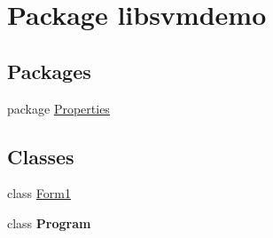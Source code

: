 \hypertarget{namespacelibsvmdemo}{
\section{Package libsvmdemo}
\label{namespacelibsvmdemo}
}
\subsection*{Packages}
\begin{DoxyCompactItemize}
\item 
package \hyperlink{namespacelibsvmdemo_1_1_properties}{Properties}
\end{DoxyCompactItemize}
\subsection*{Classes}
\begin{DoxyCompactItemize}
\item 
class \hyperlink{classlibsvmdemo_1_1_form1}{Form1}
\item 
class {\bfseries Program}
\end{DoxyCompactItemize}
